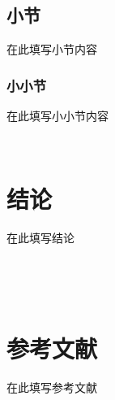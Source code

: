 \documentclass{article}
\begin{document}
\begin{CJK}{UTF8}{gbsn}
\subsection{小节}

在此填写小节内容

\subsubsection{小小节}

在此填写小小节内容

\

\section{结论}

在此填写结论

\

\

\section*{参考文献}

在此填写参考文献
\end{CJK}
\end{document}
